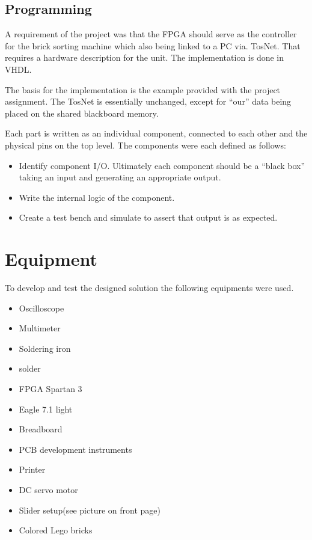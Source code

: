 \subsection{Programming}
A requirement of the project was that the FPGA should serve as the controller for the brick sorting machine which also being linked to a PC via. \textmu TosNet. That requires a hardware description for the unit. The implementation is done in VHDL.

The basis for the implementation is the example provided with the project assignment. The \textmu TosNet is essentially unchanged, except for ``our'' data being placed on the shared blackboard memory.

Each part is written as an individual component, connected to each other and the physical pins on the top level. The components were each defined as follows:
\begin{itemize}
	\item Identify component I/O. Ultimately each component should be a ``black box'' taking an input and generating an appropriate output.
	\item Write the internal logic of the component.
	\item Create a test bench and simulate to assert that output is as expected.
\end{itemize}


\section{Equipment}
\label{sec:equipment}

To develop and test the designed solution the following equipments were used.

\begin{itemize}
\item Oscilloscope
\item Multimeter
\item Soldering iron
\item solder
\item FPGA Spartan 3
\item Eagle 7.1 light
\item Breadboard
\item PCB development instruments
\item Printer
\item DC servo motor
\item Slider setup(see picture on front page)
\item Colored Lego bricks
\end{itemize}





